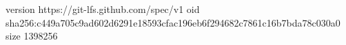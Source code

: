 version https://git-lfs.github.com/spec/v1
oid sha256:c449a705c9ad602d6291e18593cfac196eb6f294682c7861c16b7bda78c030a0
size 1398256
